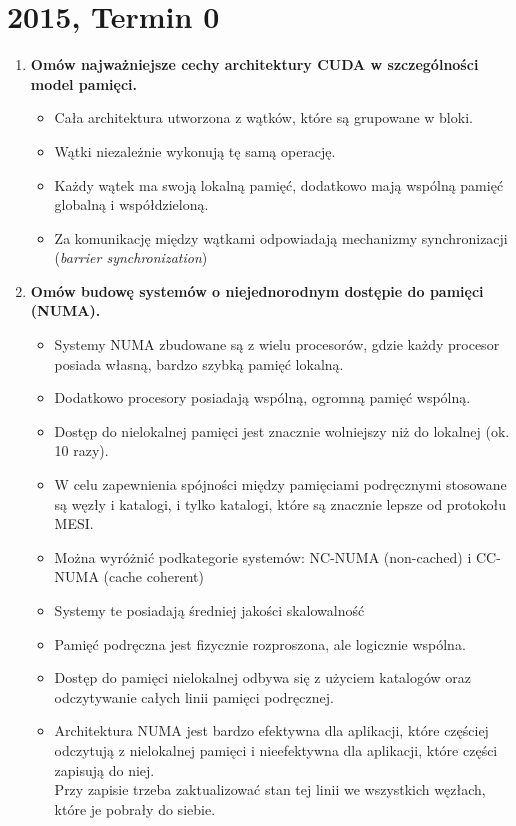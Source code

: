 	\section{2015, Termin 0}
		\begin{enumerate}
			\item \textbf{Omów najważniejsze cechy architektury CUDA w szczególności model pamięci.}
				\begin{itemize}
					\item Cała architektura utworzona z wątków, które są grupowane w bloki.
					\item Wątki niezależnie wykonują tę samą operację.
					\item Każdy wątek ma swoją lokalną pamięć, dodatkowo mają wspólną pamięć globalną i współdzieloną.
					\item Za komunikację między wątkami odpowiadają mechanizmy synchronizacji (\emph{barrier synchronization})
				\end{itemize}
			\item \textbf{Omów budowę systemów o niejednorodnym dostępie do pamięci (NUMA).}
			\begin{itemize}
				\item Systemy NUMA zbudowane są z wielu procesorów, gdzie każdy procesor posiada własną, bardzo szybką pamięć lokalną.
				\item Dodatkowo procesory posiadają wspólną, ogromną pamięć wspólną.
				\item Dostęp do nielokalnej pamięci jest znacznie wolniejszy niż do lokalnej (ok. 10 razy).
				\item W celu zapewnienia spójności między pamięciami podręcznymi stosowane są węzły i katalogi, i tylko katalogi, które są znacznie lepsze od protokołu MESI.
				\item Można wyróżnić podkategorie systemów: NC-NUMA (non-cached) i CC-NUMA (cache coherent)
				\item Systemy te posiadają średniej jakości skalowalność
				\item Pamięć podręczna jest fizycznie rozproszona, ale logicznie wspólna.
				\item Dostęp do pamięci nielokalnej odbywa się z użyciem katalogów oraz odczytywanie całych linii pamięci podręcznej.
				\item Architektura NUMA jest bardzo efektywna dla aplikacji, które częściej odczytują z nielokalnej pamięci i nieefektywna dla aplikacji, które części zapisują do niej.\\
				Przy zapisie trzeba zaktualizować stan tej linii we wszystkich węzłach, które je pobrały do siebie.

\end{itemize}
\end{enumerate}
